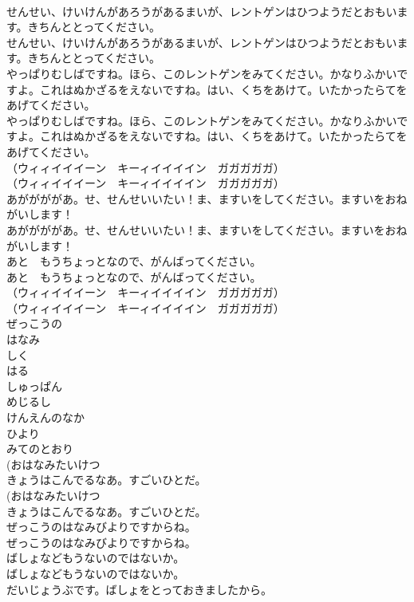 \documentclass[8pt]{extreport}
\begin{document}
\begin{CJK}{UTF8}{min}
\\	せんせい、けいけんがあろうがあるまいが、レントゲンはひつようだとおもいます。きちんととってください。
\\	せんせい、けいけんがあろうがあるまいが、レントゲンはひつようだとおもいます。きちんととってください。
\\	やっぱりむしばですね。ほら、このレントゲンをみてください。かなりふかいですよ。これはぬかざるをえないですね。はい、くちをあけて。いたかったらてをあげてください。
\\	やっぱりむしばですね。ほら、このレントゲンをみてください。かなりふかいですよ。これはぬかざるをえないですね。はい、くちをあけて。いたかったらてをあげてください。
\\	（ウィィイイイーン　キーィイイイイン　ガガガガガ）
\\	（ウィィイイイーン　キーィイイイイン　ガガガガガ）
\\	あががががあ。せ、せんせいいたい！ま、ますいをしてください。ますいをおねがいします！
\\	あががががあ。せ、せんせいいたい！ま、ますいをしてください。ますいをおねがいします！
\\	あと　もうちょっとなので、がんばってください。
\\	あと　もうちょっとなので、がんばってください。
\\	（ウィィイイイーン　キーィイイイイン　ガガガガガ）
\\	（ウィィイイイーン　キーィイイイイン　ガガガガガ）
\\	ぜっこうの
\\	はなみ
\\	しく
\\	はる
\\	しゅっぱん
\\	めじるし
\\	けんえんのなか
\\	ひより
\\	みてのとおり
\\	(おはなみたいけつ 
\\	きょうはこんでるなあ。すごいひとだ。
\\	(おはなみたいけつ 
\\	きょうはこんでるなあ。すごいひとだ。
\\	ぜっこうのはなみびよりですからね。
\\	ぜっこうのはなみびよりですからね。
\\	ばしょなどもうないのではないか。
\\	ばしょなどもうないのではないか。
\\	だいじょうぶです。ばしょをとっておきましたから。

\end{CJK}
\end{document}
